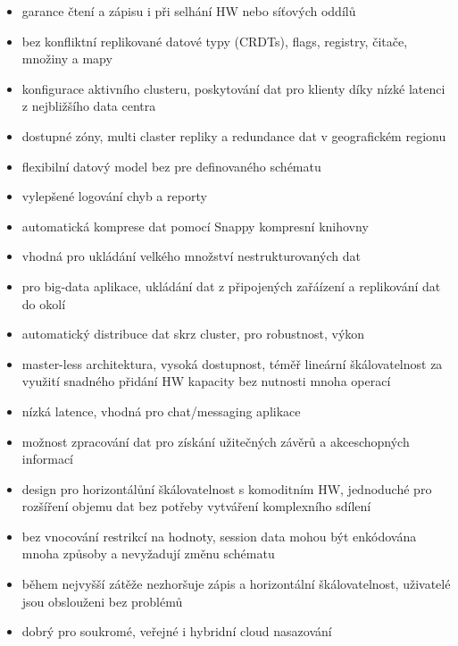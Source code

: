 \documentclass[czech,bachelor,dept460,male,csharp,cpdeclaration]{diploma}
\begin{document}
		\begin{itemize}
			\item garance čtení a zápisu i při selhání HW nebo síťových oddílů
			\item bez konfliktní replikované datové typy (CRDTs), flags, registry, čitače, množiny a mapy
			\item konfigurace aktivního clusteru, poskytování dat pro klienty díky nízké latenci z nejbližšího data centra
			\item dostupné zóny, multi claster repliky a redundance dat v geografickém regionu
			\item flexibilní datový model bez pre definovaného schématu
			\item vylepšené logování chyb a reporty
			\item automatická komprese dat pomocí Snappy kompresní knihovny
			\item vhodná pro ukládání velkého množství nestrukturovaných dat
			\item pro big-data aplikace, ukládání dat z připojených zařáízení a replikování dat do okolí
			\item automatický distribuce dat skrz cluster, pro robustnost, výkon
			\item master-less architektura, vysoká dostupnost, téměř lineární škálovatelnost za využití snadného přidání HW kapacity bez nutnosti mnoha operací
			\item nízká latence, vhodná pro chat/messaging aplikace
			\item možnost zpracování dat pro získání užitečných závěrů a akceschopných informací
			\item design pro horizontálůní škálovatelnost s komoditním HW, jednoduché pro rozšíření objemu dat bez potřeby vytváření komplexního sdílení
			\item bez vnocování restrikcí na hodnoty, session data mohou být enkódována mnoha způsoby a nevyžadují změnu schématu
			\item během nejvyšší zátěže nezhoršuje zápis a horizontální škálovatelnost, uživatelé jsou obslouženi bez problémů
			\item dobrý pro soukromé, veřejné i hybridní cloud nasazování
		\end{itemize}
 
	
\end{document}
